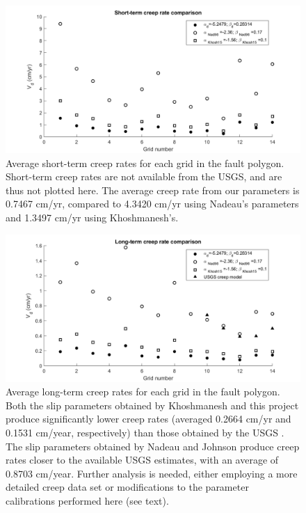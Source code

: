 \documentclass{article}
\begin{document}
\begin{figure}
\centering
\includegraphics[width=6.5in]{short_term_creep.png}
\caption{\label{fig:Vd_short} Average short-term creep rates for each grid in the fault polygon. Short-term creep rates are not available from the USGS, and are thus not plotted here. The average creep rate from our parameters is 0.7467 cm/yr, compared to 4.3420 cm/yr using Nadeau's parameters and 1.3497 cm/yr using Khoshmanesh's. }
\end{figure}

\begin{figure}
\centering
\includegraphics[width=6.5in]{long_term_creep.png}
\caption{\label{fig:Vd_long} Average long-term creep rates for each grid in the fault polygon. Both the slip parameters obtained by Khoshmanesh and this project produce significantly lower creep rates (averaged 0.2664 cm/yr and 0.1531 cm/year, respectively) than those obtained by the USGS \cite{johnson22}. The slip parameters obtained by Nadeau and Johnson \cite{nadeau98} produce creep rates closer to the available USGS estimates, with an average of 0.8703 cm/year. Further analysis is needed, either employing a more detailed creep data set or modifications to the parameter calibrations performed here (see text).}
\end{figure}
\end{document}
